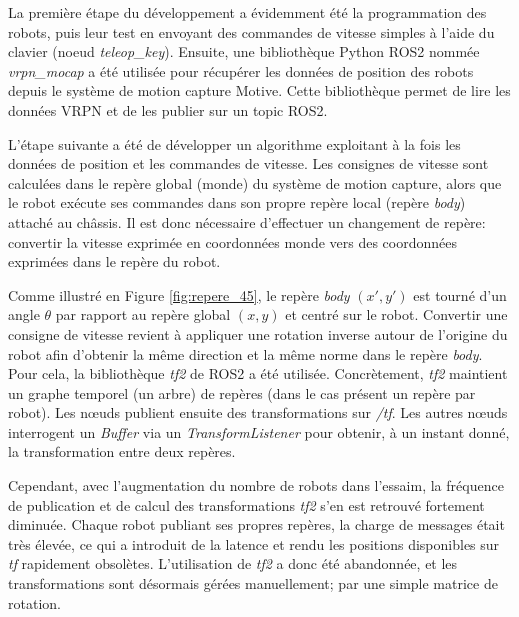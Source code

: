 La première étape du développement a évidemment été la programmation des robots, puis leur test en envoyant des commandes de vitesse simples à l'aide du clavier (noeud \textit{teleop\_key}). Ensuite, une bibliothèque Python ROS2 nommée \textit{vrpn\_mocap} a été utilisée pour récupérer les données de position des robots depuis le système de motion capture Motive. Cette bibliothèque permet de lire les données VRPN et de les publier sur un topic ROS2.

L'étape suivante a été de développer un algorithme exploitant à la fois les données de position et les commandes de vitesse. Les consignes de vitesse sont calculées dans le repère global (monde) du système de motion capture, alors que le robot exécute ses commandes dans son propre repère local (repère \textit{body}) attaché au châssis. Il est donc nécessaire d'effectuer un changement de repère: convertir la vitesse exprimée en coordonnées monde vers des coordonnées exprimées dans le repère du robot.

Comme illustré en Figure \ref{fig:repere_45}, le repère \textit{body} $(x',y')$ est tourné d'un angle $\theta$ par rapport au repère global $(x,y)$ et centré sur le robot. Convertir une consigne de vitesse revient à appliquer une rotation inverse autour de l'origine du robot afin d'obtenir la même direction et la même norme dans le repère \textit{body}. Pour cela, la bibliothèque \textit{tf2} de ROS2 a été utilisée. 
Concrètement, \textit{tf2} maintient un graphe temporel (un arbre) de repères (dans le cas présent un repère par robot). Les nœuds publient ensuite des transformations sur \textit{/tf}. Les autres nœuds interrogent un \textit{Buffer} via un \textit{TransformListener} pour obtenir, à un instant donné, la transformation entre deux repères.

Cependant, avec l’augmentation du nombre de robots dans l’essaim, la fréquence de publication et de calcul des transformations \textit{tf2} s'en est retrouvé fortement diminuée. Chaque robot publiant ses propres repères, la charge de messages était très élevée, ce qui a introduit de la latence et rendu les positions disponibles sur \textit{tf} rapidement obsolètes. L'utilisation de \textit{tf2} a donc été abandonnée, et les transformations sont désormais gérées manuellement; par une simple matrice de rotation.

